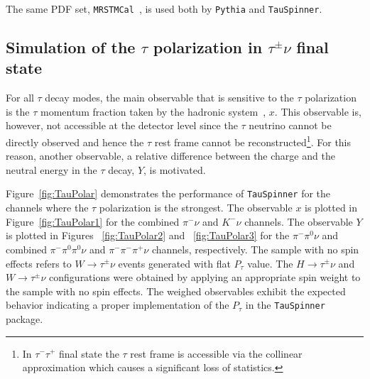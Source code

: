 \documentclass[12pt]{article}
\def\Wtaunu{\ensuremath{W\to\tau^{\pm}\nu}\xspace}
\def\Htaunu{\ensuremath{H\to\tau^{\pm}\nu}\xspace}
\def\TauNu{\ensuremath{\tau^{\pm}\nu}\xspace}
\def\TauTau{\ensuremath{\tau^{-}\tau^{+}}\xspace}
\def\Tau{\ensuremath{\tau}\xspace}
\def\RHO{\ensuremath{\pi^{-}\pi^{0}\nu}\xspace}
\def\ARES{\ensuremath{\pi^{-}\pi^{0}\pi^{0}\nu}\xspace}
\def\ARESMULTI{\ensuremath{\pi^{-}\pi^{-}\pi^{+}\nu}\xspace}
\def\PI{\ensuremath{\pi^{-}\nu}\xspace}
\def\KA{\ensuremath{K^{-}\nu}\xspace}
\def\PTAU{\ensuremath{P_{\tau}}\xspace}
\begin{document}
The same PDF set, {\tt MRSTMCal}~\cite{LHAPDF-pdfsets}, is used both by {\tt Pythia}
and {\tt TauSpinner}.


\subsection{Simulation of the \Tau polarization in \TauNu final state}


For all \Tau decay modes, the main observable that is sensitive to 
the \Tau polarization is the \Tau momentum fraction taken by the
hadronic system~\cite{B235}, $x$. 
This observable is, however, not accessible at the detector level
since the \Tau neutrino cannot be directly observed and hence the 
\Tau rest frame cannot be reconstructed\footnote{In \TauTau
final state the \Tau rest frame is accessible via the collinear
approximation which causes a
significant loss of statistics.}. For this reason, another
observable, a relative difference between the charge and the neutral 
energy in the \Tau decay, $Y$, is motivated.


Figure~\ref{fig:TauPolar} demonstrates the performance of {\tt TauSpinner}
for the channels where the \Tau polarization is the strongest.
The observable $x$ is plotted in Figure~\ref{fig:TauPolar1} 
for the combined \PI and \KA channels. The observable $Y$ is plotted in Figures 
~\ref{fig:TauPolar2} and ~\ref{fig:TauPolar3} for the \RHO and
combined \ARES and \ARESMULTI channels, respectively.
The sample with no spin effects refers to \Wtaunu events generated
with flat \PTAU value. The \Htaunu and \Wtaunu configurations were obtained by applying an
appropriate spin weight to the sample with no spin effects.
The weighed observables exhibit the expected behavior
indicating a proper implementation of the \PTAU in the {\tt TauSpinner} package.
\end{document}

